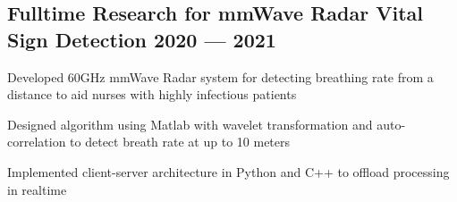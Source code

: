 \documentclass[letter,10pt]{article}
\begin{document}


\subsection{{Fulltime Research for mmWave Radar Vital Sign Detection \hfill 2020 --- 2021}}
\begin{zitemize}
\item Developed 60GHz mmWave Radar system for detecting breathing rate from a distance to aid nurses with highly infectious patients
\item Designed algorithm using Matlab with wavelet transformation and auto-correlation to detect breath rate at up to 10 meters
\item Implemented client-server architecture in Python and C++ to offload processing in realtime
\end{zitemize}
\end{document}
